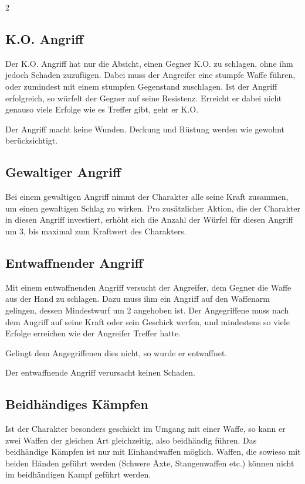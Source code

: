 \begin{multicols}{2}
\begin{pexample}[Beispiel]
\subsection{K.O. Angriff}

Der K.O. Angriff hat nur die Absicht, einen Gegner K.O. zu schlagen, ohne ihm jedoch Schaden zuzufügen. Dabei muss der Angreifer eine stumpfe Waffe führen, oder zumindest mit einem stumpfen Gegenstand zuschlagen. Ist der Angriff erfolgreich, so würfelt der Gegner auf seine Resistenz. Erreicht er dabei nicht genauso viele Erfolge wie es Treffer gibt, geht er K.O.

Der Angriff macht keine Wunden. Deckung und Rüstung werden wie gewohnt berücksichtigt.

\subsection{Gewaltiger Angriff}

Bei einem gewaltigen Angriff nimmt der Charakter alle seine Kraft zusammen, um einen gewaltigen Schlag zu wirken. Pro zusätzlicher Aktion, die der Charakter in diesen Angriff investiert, erhöht sich die Anzahl der Würfel für diesen Angriff um 3, bis maximal zum Kraftwert des Charakters.

\subsection{Entwaffnender Angriff}

Mit einem entwaffnenden Angriff versucht der Angreifer, dem Gegner die Waffe aus der Hand zu schlagen. Dazu muss ihm ein Angriff auf den Waffenarm gelingen, dessen Mindestwurf um 2 angehoben ist. Der Angegriffene muss nach dem Angriff auf seine Kraft oder sein Geschick werfen, und mindestens so viele Erfolge erreichen wie der Angreifer Treffer hatte.

Gelingt dem Angegriffenen dies nicht, so wurde er entwaffnet.

Der entwaffnende Angriff verursacht keinen Schaden.

\subsection{Beidhändiges Kämpfen}

Ist der Charakter besonders geschickt im Umgang mit einer Waffe, so kann er zwei Waffen der gleichen Art gleichzeitig, also beidhändig führen. Das beidhändige Kämpfen ist nur mit Einhandwaffen möglich. Waffen, die sowieso mit beiden Händen geführt werden (Schwere Äxte, Stangenwaffen etc.) können nicht im beidhändigen Kampf geführt werden.


\end{pexample}
\end{multicols}
